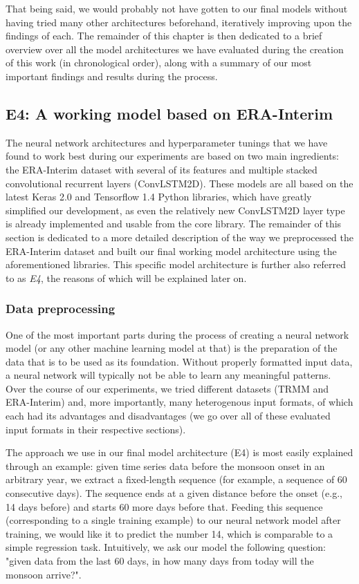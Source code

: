 That being said, we would probably not have gotten to our final models without having tried many other architectures beforehand, iteratively improving upon the findings of each. The remainder of this chapter is then dedicated to a brief overview over all the model architectures we have evaluated during the creation of this work (in chronological order), along with a summary of our most important findings and results during the process.

\subsection{E4: A working model based on ERA-Interim}
\label{sst:final_model}
The neural network architectures and hyperparameter tunings that we have found to work best during our experiments are based on two main ingredients: the ERA-Interim dataset with several of its features and multiple stacked convolutional recurrent layers (ConvLSTM2D). These models are all based on the latest Keras 2.0 and Tensorflow 1.4 Python libraries, which have greatly simplified our development, as even the relatively new ConvLSTM2D layer type is already implemented and usable from the core library. The remainder of this section is dedicated to a more detailed description of the way we preprocessed the ERA-Interim dataset and built our final working model architecture using the aforementioned libraries. This specific model architecture is further also referred to as \textit{E4}, the reasons of which will be explained later on.

\subsubsection{Data preprocessing}
One of the most important parts during the process of creating a neural network model (or any other machine learning model at that) is the preparation of the data that is to be used as its foundation. Without properly formatted input data, a neural network will typically not be able to learn any meaningful patterns. Over the course of our experiments, we tried different datasets (TRMM and ERA-Interim) and, more importantly, many heterogenous input formats, of which each had its advantages and disadvantages (we go over all of these evaluated input formats in their respective sections).

The approach we use in our final model architecture (E4) is most easily explained through an example: given time series data before the monsoon onset in an arbitrary year, we extract a fixed-length sequence (for example, a sequence of 60 consecutive days). The sequence ends at a given distance before the onset (e.g., 14 days before) and starts 60 more days before that. Feeding this sequence (corresponding to a single training example) to our neural network model after training, we would like it to predict the number 14, which is comparable to a simple regression task. Intuitively, we ask our model the following question: "given data from the last 60 days, in how many days from today will the monsoon arrive?".

